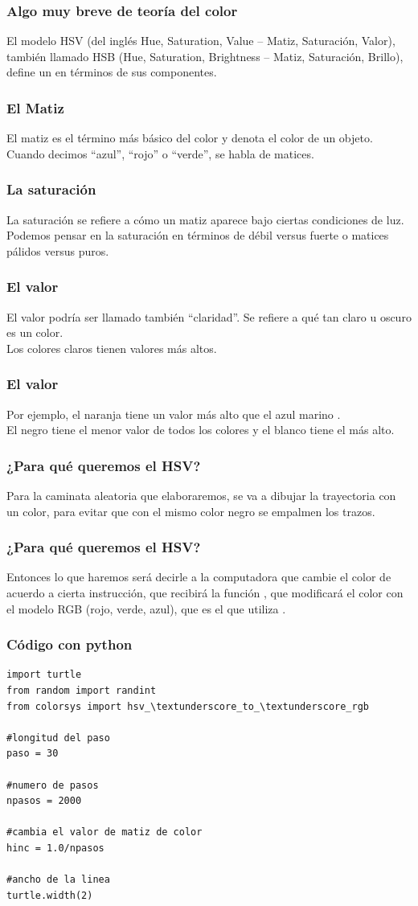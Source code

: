 \documentclass[12pt]{beamer}
\begin{document}
\begin{frame}
\frametitle{Algo muy breve de teoría del color}
El modelo HSV (del inglés Hue, Saturation, Value – Matiz, Saturación, Valor), también llamado HSB (Hue, Saturation, Brightness – Matiz, Saturación, Brillo), \pause define un  en términos de sus componentes.
\end{frame}
\begin{frame}
\frametitle{El Matiz}
El matiz es el término más básico del color y denota el color de un objeto.
\\
\bigskip
\pause
Cuando decimos \enquote{azul}, \enquote{rojo} o \enquote{verde}, se habla de matices.
\end{frame}
\begin{frame}
\frametitle{La saturación}
La saturación se refiere a cómo un matiz aparece bajo ciertas condiciones de luz.
\\
\bigskip
\pause
Podemos pensar en la saturación en términos de débil versus fuerte o matices pálidos versus puros.     
\end{frame}
\begin{frame}
\frametitle{El valor}
El valor podría ser llamado también \enquote{claridad}. \pause Se refiere a qué tan claro u oscuro es un color.
\\
\bigskip
\pause
Los colores claros tienen valores más altos.
\end{frame}
\begin{frame}
\frametitle{El valor}
Por ejemplo, el naranja  tiene un valor más alto que el azul marino .
\\
\bigskip
\pause
El negro tiene el menor valor de todos los colores y el blanco tiene el más alto.
\end{frame}
\begin{frame}
\frametitle{¿Para qué queremos el HSV?}
Para la caminata aleatoria que elaboraremos, se va a dibujar la trayectoria con un color, para evitar que con el mismo color negro se empalmen los trazos.
\end{frame}
\begin{frame}
\frametitle{¿Para qué queremos el HSV?}
Entonces lo que haremos será decirle a la computadora que cambie el color de acuerdo a cierta instrucción, que recibirá la función , que modificará el color con el modelo RGB (rojo, verde, azul), que es el que utiliza \python{}.
\end{frame}
\begin{frame}
\frametitle{Código con python}
\begin{lstlisting}[caption=Definición del espacio de trabajo]
import turtle
from random import randint
from colorsys import hsv_\textunderscore_to_\textunderscore_rgb

#longitud del paso
paso = 30

#numero de pasos
npasos = 2000

#cambia el valor de matiz de color
hinc = 1.0/npasos

#ancho de la linea
turtle.width(2)
\end{lstlisting}
\end{frame}
\end{document}
